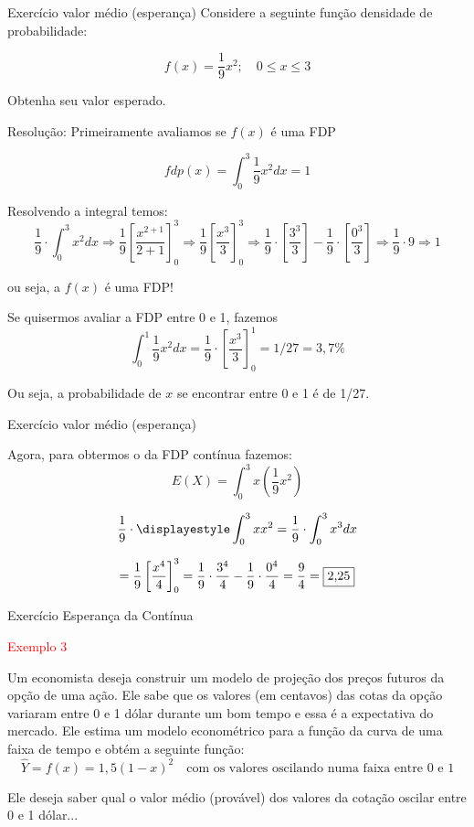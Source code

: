 \documentclass{beamer}
\begin{document}
\begin{frame}{Exercício valor médio (esperança)}\label{Exercvalmedio}
\footnotesize
Considere a seguinte função densidade de probabilidade:

$$
f(x)=\frac{1}{9}x^{2};\quad 0\leq x \leq 3
$$

Obtenha seu valor esperado.


Resolução: Primeiramente avaliamos se $f(x)$ é uma FDP

$$
fdp(x)= \displaystyle\int_{0}^{3}\frac{1}{9}x^{2}dx=1
$$

Resolvendo a integral temos:
$$
\frac{1}{9}\cdot \int _0^3x^2dx\Rightarrow\frac{1}{9}\left[\frac{x^{2+1}}{2+1}\right]^3_0\Rightarrow \frac{1}{9}\left[\frac{x^3}{3}\right]^3_0\Rightarrow\frac{1}{9}\cdot\left[\frac{3^3}{3}\right]-\frac{1}{9}\cdot\left[\frac{0^3}{3}\right]\Rightarrow\frac{1}{9}\cdot 9\Rightarrow 1
$$

ou seja, a $f(x)$ é uma FDP!
 
 
Se quisermos avaliar a FDP entre 0 e 1, fazemos $$
\displaystyle\int^{1}_{0}\frac{1}{9}x^{2}dx=\frac{1}{9}\cdot \left[\frac{x^3}{3}\right]^1_0=1/27=3,7\%
$$

Ou seja, a probabilidade de $x$ se encontrar entre 0 e 1 é de 1/27.
\end{frame}
\begin{frame}{Exercício valor médio (esperança)}

Agora, para obtermos o  da FDP contínua fazemos:
$$
E(X)=\displaystyle\int^{3}_{0}x\left(\frac{1}{9}x^{2}\right)
$$

$$
\frac{1}{9}\cdot\displayestyle\int_{0}^{3}xx^{2}=\frac{1}{9}\cdot \int _0^3x^3dx
$$

$$
=\frac{1}{9}\left[\frac{x^{4}}{4}\right]^3_0=\frac{1}{9}\cdot \frac{3^4}{4}-\frac{1}{9}\cdot\frac{0^4}{4}=\frac{9}{4}=\fbox{2,25}
$$


\end{frame}
\begin{frame}{Exercício Esperança da Contínua}

\footnotesize
\textcolor{red}{Exemplo 3}

Um economista deseja construir um modelo de projeção dos preços futuros da opção de uma ação. Ele sabe que os valores (em centavos) das cotas da opção variaram entre 0 e 1 dólar durante um bom tempo e essa é a expectativa do mercado. Ele estima um modelo econométrico para a função da curva de uma faixa de tempo e obtém a seguinte função:
$$
\widehat{Y}=f(x)=1,5(1-x)^2\quad\mbox{com os valores oscilando numa faixa entre 0 e 1}
$$

Ele deseja saber qual o valor médio (provável) dos valores da cotação oscilar entre 0 e 1 dólar...

\end{frame}
\end{document}
